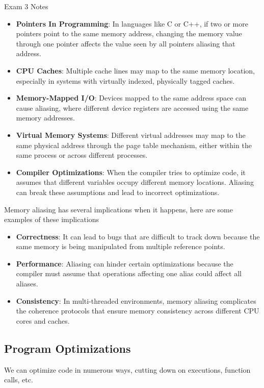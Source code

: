 \begin{examnotes}{Exam 3 Notes}
    \begin{itemize}
        \item \textbf{Pointers In Programming}: In languages like C or C++, if two or more pointers point to the same memory address, changing the memory value through one pointer affects the value 
        seen by all pointers aliasing that address.
        \item \textbf{CPU Caches}: Multiple cache lines may map to the same memory location, especially in systems with virtually indexed, physically tagged caches.
        \item \textbf{Memory-Mapped I/O}: Devices mapped to the same address space can cause aliasing, where different device registers are accessed using the same memory addresses.
        \item \textbf{Virtual Memory Systems}: Different virtual addresses may map to the same physical address through the page table mechanism, either within the same process or across different 
        processes.
        \item \textbf{Compiler Optimizations}: When the compiler tries to optimize code, it assumes that different variables occupy different memory locations. Aliasing can break these assumptions 
        and lead to incorrect optimizations.
    \end{itemize}
    Memory aliasing has several implications when it happens, here are some examples of these implications

    \begin{itemize}
        \item \textbf{Correctness}: It can lead to bugs that are difficult to track down because the same memory is being manipulated from multiple reference points.
        \item \textbf{Performance}: Aliasing can hinder certain optimizations because the compiler must assume that operations affecting one alias could affect all aliases.
        \item \textbf{Consistency}: In multi-threaded environments, memory aliasing complicates the coherence protocols that ensure memory consistency across different CPU cores and caches.
    \end{itemize}

    \subsection*{Program Optimizations}

    We can optimize code in numerous ways, cutting down on executions, function calls, etc.


\end{examnotes}
